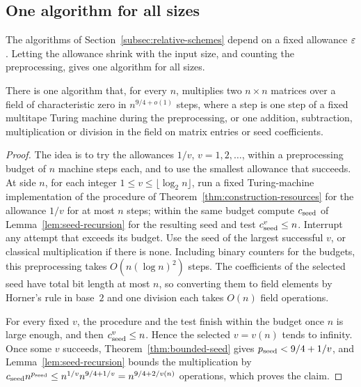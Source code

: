 \subsection{One algorithm for all sizes}
\label{subsec:uniform-setup}

The algorithms of Section~\ref{subsec:relative-schemes} depend on a
fixed allowance \(\varepsilon\). Letting the allowance shrink with the input
size, and counting the preprocessing, gives one algorithm for all sizes.

\begin{corollary}\label{cor:uniform-setup}
There is one algorithm that, for every \(n\), multiplies two
\(n\times n\) matrices over a field of characteristic zero in
\(n^{9/4+o(1)}\) steps, where a step is one step of a fixed multitape
Turing machine during the preprocessing, or one addition, subtraction,
multiplication or division in the field on matrix entries or seed
coefficients.
\end{corollary}

\begin{proof}
The idea is to try the allowances \(1/v\), \(v=1,2,\ldots\), within a
preprocessing budget of \(n\) machine steps each, and to use the
smallest allowance that succeeds. At side \(n\), for each integer
\(1\le v\le\lfloor\log_2n\rfloor\), run a fixed Turing-machine
implementation of the procedure of
Theorem~\ref{thm:construction-resources} for the allowance \(1/v\) for
at most \(n\) steps; within the same budget compute \(c_{\rm seed}\) of
Lemma~\ref{lem:seed-recursion} for the resulting seed and test
\(c_{\rm seed}^v\le n\). Interrupt any attempt that exceeds its budget.
Use the seed of the largest successful \(v\), or classical
multiplication if there is none. Including binary counters for the
budgets, this preprocessing takes \(O(n(\log n)^2)\) steps. The
coefficients of the selected seed have total bit length at most \(n\),
so converting them to field elements by Horner's rule in base~\(2\) and
one division each takes \(O(n)\) field operations.

For every fixed \(v\), the procedure and the test finish within the
budget once \(n\) is large enough, and then \(c_{\rm seed}^v\le n\).
Hence the selected \(v=v(n)\) tends to infinity. Once some \(v\)
succeeds, Theorem~\ref{thm:bounded-seed} gives
\(p_{\rm seed}<9/4+1/v\), and Lemma~\ref{lem:seed-recursion} bounds the
multiplication by
\(c_{\rm seed}n^{p_{\rm seed}}\le n^{1/v}n^{9/4+1/v}=n^{9/4+2/v(n)}\)
operations, which proves the claim.
\end{proof}

